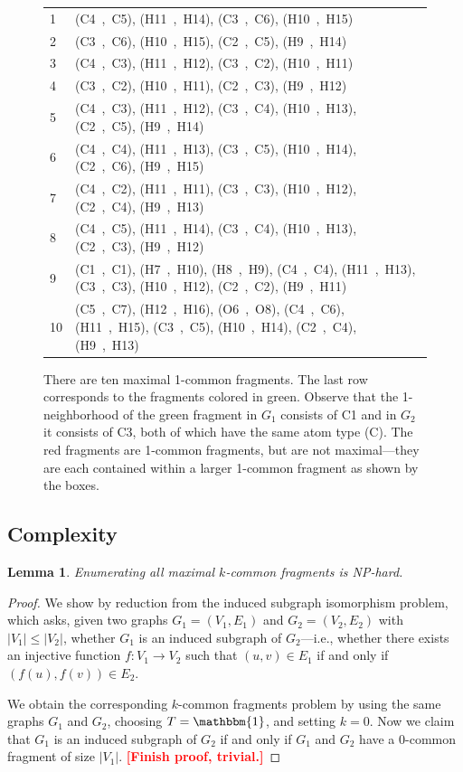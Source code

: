 \documentclass[11pt]{article}
\newcommand{\todo}[1]{\xspace{\bfseries\sffamily\textcolor{red}{[#1]}}\xspace}
\newtheorem{lemma}[theorem]{Lemma}
\begin{document}
\begin{figure}
{\begin{tabular}{|l|p{}|}
      \hline
      1 & (C4~,~C5), (H11~,~H14), (C3~,~C6), (H10~,~H15)\\
      2 & (C3~,~C6), (H10~,~H15), (C2~,~C5), (H9~,~H14)\\
      3 & (C4~,~C3), (H11~,~H12), (C3~,~C2), (H10~,~H11)\\
      4 & (C3~,~C2), (H10~,~H11), (C2~,~C3), (H9~,~H12)\\
      5 & (C4~,~C3), (H11~,~H12), (C3~,~C4), (H10~,~H13), (C2~,~C5), (H9~,~H14)\\
      6 & (C4~,~C4), (H11~,~H13), (C3~,~C5), (H10~,~H14), (C2~,~C6), (H9~,~H15)\\
      7 & (C4~,~C2), (H11~,~H11), (C3~,~C3), (H10~,~H12), (C2~,~C4), (H9~,~H13)\\
      8 & (C4~,~C5), (H11~,~H14), (C3~,~C4), (H10~,~H13), (C2~,~C3), (H9~,~H12)\\
      9 & (C1~,~C1), (H7~,~H10), (H8~,~H9), (C4~,~C4), (H11~,~H13), (C3~,~C3), (H10~,~H12), (C2~,~C2), (H9~,~H11)\\
      10 & (C5~,~C7), (H12~,~H16), (O6~,~O8), (C4~,~C6), (H11~,~H15), (C3~,~C5), (H10~,~H14), (C2~,~C4), (H9~,~H13)\\
      \hline
    \end{tabular}
  }
  \caption{There are ten maximal 1-common fragments. The last row corresponds to
    the fragments colored in green. Observe that the 1-neighborhood of the green
    fragment in $G_1$ consists of C1 and in $G_2$ it consists of C3, both of
    which have the same atom type (C). The red fragments are 1-common fragments,
    but are not maximal---they are each contained within a larger 1-common
    fragment as shown by the boxes.}
  \label{fig:example}
\end{figure}

\subsection{Complexity}

\begin{lemma}
Enumerating all maximal $k$-common fragments is NP-hard.
\end{lemma}
\begin{proof}
  We show by reduction from the induced subgraph isomorphism problem, which
  asks, given two graphs $G_1 = (V_1, E_1)$ and $G_2 = (V_2, E_2)$ with $|V_1|
  \leq |V_2|$, whether $G_1$ is an induced subgraph of $G_2$---i.e., whether 
  there exists an injective function $f : V_1 \rightarrow V_2$ such that $(u,v)
  \in E_1$ if and only if $(f(u),f(v)) \in E_2$.

  We obtain the corresponding $k$-common fragments problem by using the same
  graphs $G_1$ and $G_2$, choosing $T = \mathbbm{1}$, and setting $k = 0$. Now
  we claim that $G_1$ is an induced subgraph of $G_2$ if and only if $G_1$ and
  $G_2$ have a 0-common fragment of size $|V_1|$. \todo{Finish proof, trivial.}
\end{proof}
\end{document}
